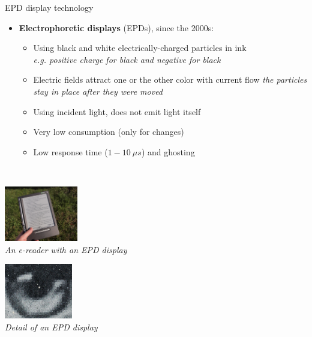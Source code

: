 \begin{frame}{EPD display technology}
  \begin{itemize}
  \item \textbf{Electrophoretic displays} (EPDs), since the 2000s:
    \begin{itemize}
    \item Using black and white electrically-charged particles in ink\\
    \textit{e.g. positive charge for black and negative for black}
    \item Electric fields attract one or the other color with current flow
    \textit{the particles stay in place after they were moved}
    \item Using incident light, does not emit light itself
    \item Very low consumption (only for changes)
    \item Low response time (\(1-10~\mu s\)) and ghosting
    \end{itemize}
  \end{itemize}~

  \begin{minipage}[b]{0.45\textwidth}
    \centering
    \includegraphics[height=6.5em]{slides/graphics-introduction/e-reader.jpg}\\
    \textit{\small An e-reader with an EPD display}
  \end{minipage}
  \hfill
  \begin{minipage}[b]{0.45\textwidth}
    \centering
    \includegraphics[height=6.5em]{slides/graphics-introduction/epd-detail.jpg}\\
    \textit{\small Detail of an EPD display}
  \end{minipage}
\end{frame}

